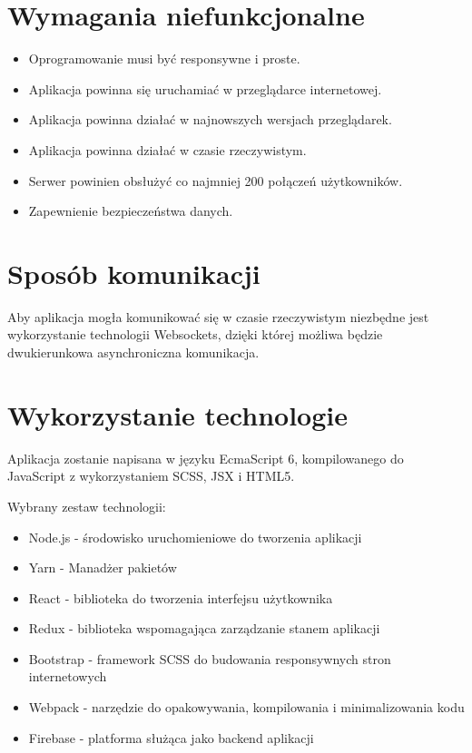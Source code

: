\section{Wymagania niefunkcjonalne}

\begin{itemize}
    \item Oprogramowanie musi być responsywne i proste.
    \item Aplikacja powinna się uruchamiać w przeglądarce internetowej.
    \item Aplikacja powinna działać w najnowszych wersjach przeglądarek.
    \item Aplikacja powinna działać w czasie rzeczywistym.
    \item Serwer powinien obsłużyć co najmniej 200 połączeń użytkowników.
    \item Zapewnienie bezpieczeństwa danych.
\end{itemize}

\section{Sposób komunikacji}

Aby aplikacja mogła komunikować się w czasie rzeczywistym niezbędne jest wykorzystanie
technologii Websockets, dzięki której możliwa będzie dwukierunkowa asynchroniczna komunikacja.

\section{Wykorzystanie technologie}

Aplikacja zostanie napisana w języku EcmaScript 6, kompilowanego do JavaScript
z wykorzystaniem SCSS, JSX i HTML5.

Wybrany zestaw technologii:
\begin{itemize}
    \item Node.js - środowisko uruchomieniowe do tworzenia aplikacji
    \item Yarn - Manadżer pakietów
    \item React -  biblioteka do tworzenia interfejsu użytkownika
    \item Redux - biblioteka wspomagająca zarządzanie stanem aplikacji
    \item Bootstrap - framework SCSS do budowania responsywnych stron internetowych
    \item Webpack - narzędzie do opakowywania, kompilowania i minimalizowania kodu
    \item Firebase - platforma służąca jako backend aplikacji
\end{itemize}
